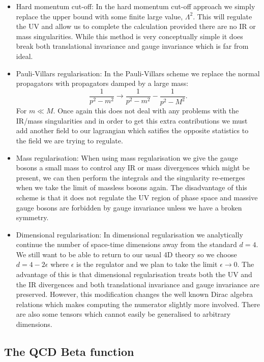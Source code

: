 	\begin{itemize}
	\item Hard momentum cut-off: In the hard momentum cut-off approach we simply replace the upper bound with some finite large value, $\Lambda^2$.  This will regulate the UV and allow us to complete the calculation provided there are no IR or mass singularities.  While this method is very conceptually simple it does break both translational invariance and gauge invariance which is far from ideal.
	\item Pauli-Villars regularisation: In the Pauli-Villars scheme we replace the normal propagators with propagators damped by a large mass:
	      \begin{equation}
	      \frac{1}{p^2-m^2}\rightarrow\frac{1}{p^2-m^2} - \frac{1}{p^2-M^2}.
	      \end{equation}
	      For $m\ll M$.  Once again this does not deal with any problems with the IR/mass singularities and in order to get this extra contributions we must add another field to our lagrangian which satifies the opposite statistics to the field we are trying to regulate.
	\item Mass regularisation: When using mass regularisation we give the gauge bosons a small mass to control any IR or mass divergences which might be present, we can then perform the integrals and the singularity re-emerges when we take the limit of massless bosons again.  The disadvantage of this scheme is that it does not regulate the UV region of phase space and massive gauge bosons are forbidden by gauge invariance unless we have a broken symmetry.
	\item Dimensional regularisation:  In dimensional regularisation we analytically continue the number of space-time dimensions away from the standard $d=4$.  We still want to be able to return to our usual 4D theory so we choose $d=4-2\epsilon$ where $\epsilon$ is the regulator and we plan to take the limit $\epsilon\rightarrow 0$.  The advantage of this is that dimensional regularisation treats both the UV and the IR divergences and both translational invariance and gauge invariance are preserved.  However, this modification changes the well known Dirac algebra relations which makes computing the numerator slightly more involved.  There are also some tensors which cannot easily be generalised to arbitrary dimensions.
	\end{itemize}

	\subsection{The QCD Beta function}

